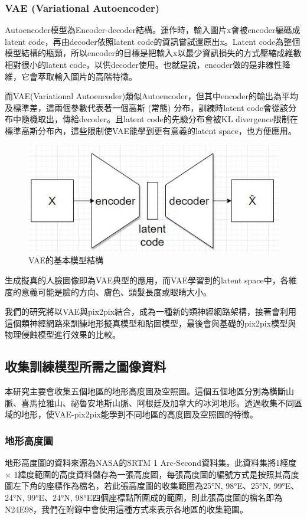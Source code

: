 \documentclass[a4paper, 12pt]{article}
\begin{document}
\subsubsection{VAE (Variational Autoencoder)}
Autoencoder模型為Encoder-decoder結構。運作時，輸入圖片x會被encoder編碼成latent code，再由decoder依照latent code的資訊嘗試還原出x。Latent code為整個模型結構的瓶頸，所以encoder的目標是把輸入x以最少資訊損失的方式壓縮成維數相對很小的latent code，以供decoder使用。也就是說，encoder做的是非線性降維，它會萃取輸入圖片的高階特徵。

而VAE(Variational Autoencoder)\cite{kingma2013auto}類似Autoencoder，但其中encoder的輸出為平均及標準差，這兩個參數代表著一個高斯 (常態) 分布，訓練時latent code會從該分布中隨機取出，傳給decoder。且latent code的先驗分布會被KL divergence限制在標準高斯分布內，這些限制使VAE能學到更有意義的latent space，也方便應用。

\begin{figure}[htbp]
    \centering
    \includegraphics[width=0.5\linewidth]{fig/6.jpg}
    \caption{VAE的基本模型結構}
    \label{fig:6}
\end{figure}

生成擬真的人臉圖像即為VAE典型的應用，而VAE學習到的latent space中，各維度的意義可能是臉的方向、膚色、頭髮長度或眼睛大小。

我們的研究將以VAE與pix2pix結合，成為一種新的類神經網路架構，接著會利用這個類神經網路來訓練地形擬真模型和貼圖模型，最後會與基礎的pix2pix模型與物理侵蝕模型進行效果的比較。



\subsection{收集訓練模型所需之圖像資料}
本研究主要會收集五個地區的地形高度圖及空照圖。這個五個地區分別為橫斷山脈、喜馬拉雅山、祕魯安地斯山脈、阿根廷及加拿大的冰河地形。透過收集不同區域的地形，使VAE-pix2pix能學到不同地區的高度圖及空照圖的特徵。
\subsubsection{地形高度圖}
地形高度圖的資料來源為NASA的SRTM 1 Arc-Second資料集\cite{srtm1arc}。此資料集將1經度 $\times$ 1緯度範圍的高度資料儲存為一張高度圖，每張高度圖的編號方式是按照其高度圖左下角的座標作為檔名，若此張高度圖的收集範圍為25°N, 98°E、25°N, 99°E、24°N, 99°E、24°N, 98°E四個座標點所圍成的範圍，則此張高度圖的檔名即為N24E98，我們在附錄中會使用這種方式來表示各地區的收集範圍。
\end{document}
